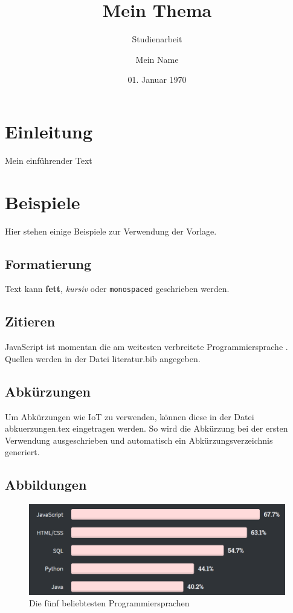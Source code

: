 \documentclass[a4paper,12pt]{scrreprt}
\title{Mein Thema}
\subtitle{Studienarbeit}
\author{Mein Name}
\date{01. Januar 1970}
\begin{document}


\tableofcontents
\listoffigures
\listoftables
\listoflistings

\clearpage

\onehalfspacing
\chapter{Einleitung}
Mein einführender Text

\chapter{Beispiele}
Hier stehen einige Beispiele zur Verwendung der Vorlage.

\section{Formatierung}
Text kann \textbf{fett}, \textit{kursiv} oder \texttt{monospaced} geschrieben werden.

\section{Zitieren}
JavaScript ist momentan die am weitesten verbreitete Programmiersprache \parencite{stackOverflowSurvey}.
Quellen werden in der Datei literatur.bib angegeben.

\section{Abkürzungen}
Um Abkürzungen wie \ac{IoT} zu verwenden, können diese in der Datei abkuerzungen.tex eingetragen werden.
So wird die Abkürzung bei der ersten Verwendung ausgeschrieben und automatisch ein Abkürzungsverzeichnis generiert.

\section{Abbildungen}
\begin{figure}[h]
    \centering
    \includegraphics[width=\textwidth]{abbildungen/top5_languages.png}
    \caption{Die fünf beliebtesten Programmiersprachen \parencite{stackOverflowSurvey}}
    \label{fig:top5languages}
\end{figure}
\end{document}
